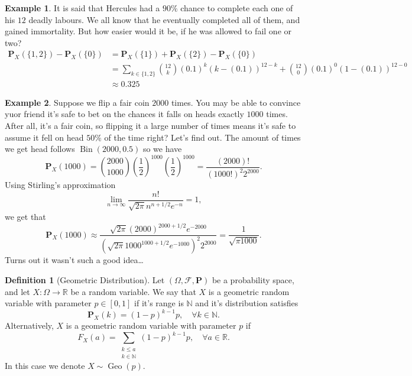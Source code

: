 \documentclass[11pt,a4paper]{article}
\theoremstyle{definition}
\newtheorem{definition}{Definition}[section]
\newtheorem{example}{Example}[section]
\theoremstyle{plain}
\DeclareMathOperator{\Bin}{Bin}
\DeclareMathOperator{\Geo}{Geo}
\newcommand{\N}{\mathbb{N}}
\newcommand{\R}{\mathbb{R}}
\newcommand{\Prob}{\mathbf{P}}
\begin{document}
  \begin{example}
  It is said that Hercules had a $90\%$ chance to complete each
  one of his $12$ deadly labours. We all know that he eventually completed
  all of them, and gained immortality. But how easier would it be, if he
  was allowed to fail one or two?
  \begin{align*}
    \Prob_X(\{1,2\}) - \Prob_X(\{0\}) &=
    \Prob_X(\{1\}) + \Prob_X(\{2\}) - \Prob_X(\{0\}) \\ &=
    \sum_{k \in \{1,2\}}
    \binom{12}{k} (0.1)^k (k - (0.1))^{12-k} +
    \binom{12}{0} (0.1)^0 (1 - (0.1))^{12-0} \\ &\approx
    0.325
  \end{align*}
  \end{example}
  \begin{example}
    Suppose we flip a fair coin $2000$ times. You may be able to convince
    yuor friend it's safe to bet on the chances it falls on heads exactly
    $1000$ times. After all, it's a fair coin, so flipping it a large number
    of times means it's safe to assume it fell on head $50\%$ of the time
    right? Let's find out. The amount of times we get head follows
    $\Bin(2000,0.5)$ so we have
    \[
      \Prob_{X}(1000) =
      \binom{2000}{1000} \left(\frac{1}{2}\right)^{1000}
      \left(\frac{1}{2}\right)^{1000} =
      \frac{(2000)!}{(1000!)^{2}2^{2000}}.
    \]
    Using Stirling's approximation
    \[
      \lim_{n\rightarrow\infty}
      {\frac{n!}{\sqrt{2\pi}n^{n+1/2}e^{-n}}}=1,
    \]
    we get that
    \[
      \Prob_{X}(1000) \approx
      \frac{\sqrt{2\pi}(2000)^{2000+1/2}e^{-2000}}
          {({\sqrt{2\pi}}1000^{1000+1/2}e^{-1000})^{2}2^{2000}} =
      {\frac{1}{\sqrt{\pi 1000}}}.
    \]
    Turns out it wasn't such a good idea\dots
  \end{example}

  \begin{definition}[Geometric Distribution]
    Let $(\Omega ,\mathcal F, \Prob)$ be a probability space,
    and let $X \colon \Omega \to \R$ be a random variable.
    We say that $X$ is a geometric random variable with parameter
    $p \in [0,1]$ if it's range is $\N$ and it's distribution satisfies
    \[
      \Prob_X(k) = (1-p)^{k-1} p, \quad 
      \forall k \in \N.
    \]
    Alternatively, $X$ is a geometric random variable with parameter
    $p$ if
    \[
      F_X(a) = \sum_{\substack{k \le a \\ k \in \N}}
      (1-p)^{k-1} p, \quad \forall a \in \R.
    \]
    In this case we denote $X \sim \Geo(p)$.
  \end{definition}
  
\end{document}
